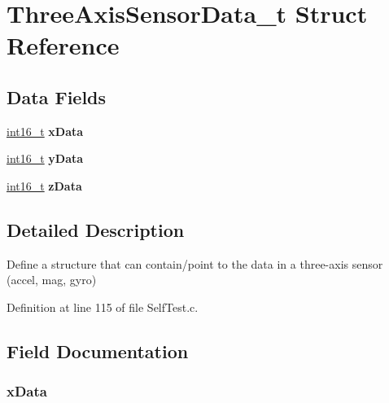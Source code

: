 \hypertarget{struct_three_axis_sensor_data__t}{\section{Three\-Axis\-Sensor\-Data\-\_\-t Struct Reference}
\label{struct_three_axis_sensor_data__t}
}
\subsection*{Data Fields}
\begin{DoxyCompactItemize}
\item 
\hypertarget{struct_three_axis_sensor_data__t_ac1c6787923f3bad936b9c33b14c16daf}{\hyperlink{_project_types_8h_a932e6ccc3d54c58f761c1aead83bd6d7}{int16\-\_\-t} {\bfseries x\-Data}}\label{struct_three_axis_sensor_data__t_ac1c6787923f3bad936b9c33b14c16daf}

\item 
\hypertarget{struct_three_axis_sensor_data__t_a09ae4bb2b92fbe9e5422b1b6f602ff10}{\hyperlink{_project_types_8h_a932e6ccc3d54c58f761c1aead83bd6d7}{int16\-\_\-t} {\bfseries y\-Data}}\label{struct_three_axis_sensor_data__t_a09ae4bb2b92fbe9e5422b1b6f602ff10}

\item 
\hypertarget{struct_three_axis_sensor_data__t_ae92f459ab8384b36ba61695c68feb33e}{\hyperlink{_project_types_8h_a932e6ccc3d54c58f761c1aead83bd6d7}{int16\-\_\-t} {\bfseries z\-Data}}\label{struct_three_axis_sensor_data__t_ae92f459ab8384b36ba61695c68feb33e}

\end{DoxyCompactItemize}


\subsection{Detailed Description}
Define a structure that can contain/point to the data in a three-\/axis sensor (accel, mag, gyro) 

Definition at line 115 of file Self\-Test.\-c.



\subsection{Field Documentation}
\hypertarget{struct_three_axis_sensor_data__t_ac1c6787923f3bad936b9c33b14c16daf}{
\subsubsection[{x\-Data}]{ x\-Data}}\label{struct_three_axis_sensor_data__t_ac1c6787923f3bad936b9c33b14c16daf}


